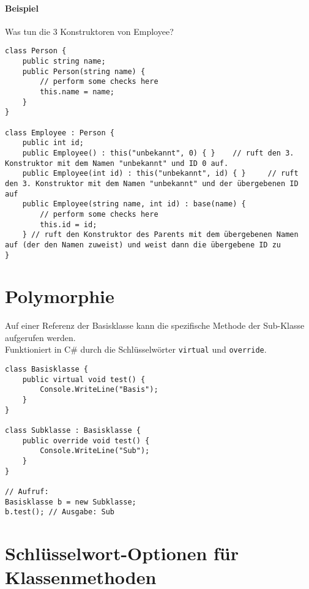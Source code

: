 \paragraph{Beispiel} Was tun die 3 Konstruktoren von Employee? 
\begin{lstlisting}[language={[Sharp]C}]
class Person {
	public string name;
	public Person(string name) {
		// perform some checks here 
		this.name = name;
	}
}

class Employee : Person {
	public int id;
	public Employee() : this("unbekannt", 0) { }	// ruft den 3. Konstruktor mit dem Namen "unbekannt" und ID 0 auf.
	public Employee(int id) : this("unbekannt", id) { }  	// ruft den 3. Konstruktor mit dem Namen "unbekannt" und der übergebenen ID auf
	public Employee(string name, int id) : base(name) {
		// perform some checks here
		this.id = id;
	} // ruft den Konstruktor des Parents mit dem übergebenen Namen auf (der den Namen zuweist) und weist dann die übergebene ID zu
}
\end{lstlisting}

\section{Polymorphie}
Auf einer Referenz der Basisklasse kann die spezifische Methode der Sub-Klasse aufgerufen werden.\\
Funktioniert in C\# durch die Schlüsselwörter \lstinline$virtual$ und \lstinline$override$. 
\begin{lstlisting}[language={[Sharp]C}]
class Basisklasse { 
	public virtual void test() { 
		Console.WriteLine("Basis"); 
	} 
} 

class Subklasse : Basisklasse { 
	public override void test() { 
		Console.WriteLine("Sub"); 
	} 
} 

// Aufruf:
Basisklasse b = new Subklasse; 
b.test(); // Ausgabe: Sub
\end{lstlisting}

\section{Schlüsselwort-Optionen für Klassenmethoden}

